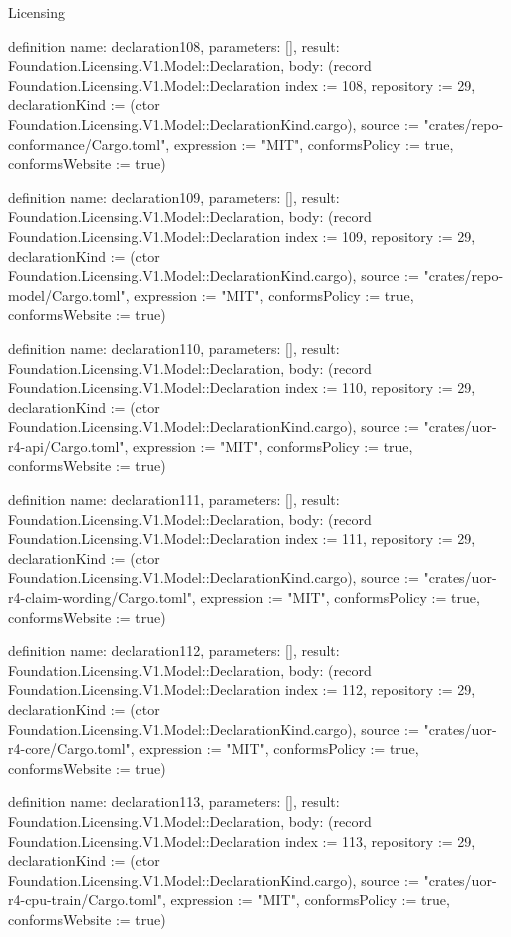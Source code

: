 \begin{lexlean}{Licensing}
\begin{semanticmodule}
definition{
  name: declaration108,
  parameters: [],
  result: Foundation.Licensing.V1.Model::Declaration,
  body: (record Foundation.Licensing.V1.Model::Declaration {index := 108, repository := 29, declarationKind := (ctor Foundation.Licensing.V1.Model::DeclarationKind.cargo), source := "crates/repo-conformance/Cargo.toml", expression := "MIT", conformsPolicy := true, conformsWebsite := true})
}

definition{
  name: declaration109,
  parameters: [],
  result: Foundation.Licensing.V1.Model::Declaration,
  body: (record Foundation.Licensing.V1.Model::Declaration {index := 109, repository := 29, declarationKind := (ctor Foundation.Licensing.V1.Model::DeclarationKind.cargo), source := "crates/repo-model/Cargo.toml", expression := "MIT", conformsPolicy := true, conformsWebsite := true})
}

definition{
  name: declaration110,
  parameters: [],
  result: Foundation.Licensing.V1.Model::Declaration,
  body: (record Foundation.Licensing.V1.Model::Declaration {index := 110, repository := 29, declarationKind := (ctor Foundation.Licensing.V1.Model::DeclarationKind.cargo), source := "crates/uor-r4-api/Cargo.toml", expression := "MIT", conformsPolicy := true, conformsWebsite := true})
}

definition{
  name: declaration111,
  parameters: [],
  result: Foundation.Licensing.V1.Model::Declaration,
  body: (record Foundation.Licensing.V1.Model::Declaration {index := 111, repository := 29, declarationKind := (ctor Foundation.Licensing.V1.Model::DeclarationKind.cargo), source := "crates/uor-r4-claim-wording/Cargo.toml", expression := "MIT", conformsPolicy := true, conformsWebsite := true})
}

definition{
  name: declaration112,
  parameters: [],
  result: Foundation.Licensing.V1.Model::Declaration,
  body: (record Foundation.Licensing.V1.Model::Declaration {index := 112, repository := 29, declarationKind := (ctor Foundation.Licensing.V1.Model::DeclarationKind.cargo), source := "crates/uor-r4-core/Cargo.toml", expression := "MIT", conformsPolicy := true, conformsWebsite := true})
}

definition{
  name: declaration113,
  parameters: [],
  result: Foundation.Licensing.V1.Model::Declaration,
  body: (record Foundation.Licensing.V1.Model::Declaration {index := 113, repository := 29, declarationKind := (ctor Foundation.Licensing.V1.Model::DeclarationKind.cargo), source := "crates/uor-r4-cpu-train/Cargo.toml", expression := "MIT", conformsPolicy := true, conformsWebsite := true})
}


\end{semanticmodule}
\end{lexlean}
